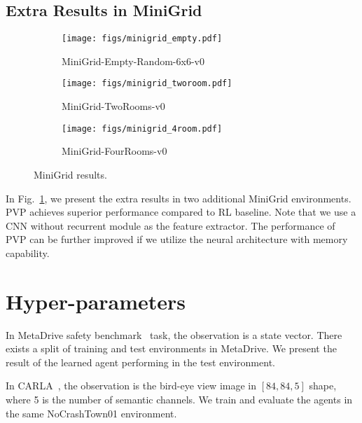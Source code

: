 \subsection{Extra Results in MiniGrid}
\label{section:appendix-extra-results}

\begin{figure}[H]
\centering
\begin{subfigure}[b]{0.34\linewidth}
         \centering
         \texttt{[image: figs/minigrid\_empty.pdf]}
         \caption{MiniGrid-Empty-Random-6x6-v0}
     \end{subfigure}
\begin{subfigure}[b]{0.32\linewidth}
         \centering
         \texttt{[image: figs/minigrid\_tworoom.pdf]}
         \caption{MiniGrid-TwoRooms-v0
}
\end{subfigure}
\begin{subfigure}[b]{0.32\linewidth}
         \centering
         \texttt{[image: figs/minigrid\_4room.pdf]}
         \caption{MiniGrid-FourRooms-v0
}
\end{subfigure}
\caption{
MiniGrid results.
}
\label{fig:minigrid-extra}
\end{figure}
In Fig.~\ref{fig:minigrid-extra}, we present the extra results in two additional MiniGrid environments. PVP achieves superior performance compared to RL baseline. Note that we use a CNN without recurrent module as the feature extractor. The performance of PVP can be further improved if we utilize the neural architecture with memory capability.




\section{Hyper-parameters}
\label{section:appendix-hyper-parameters}


In MetaDrive safety benchmark~\citep{li2021metadrive} task, the observation is a state vector. There exists a split of training and test environments in MetaDrive. We present the result of the learned agent performing in the test environment. 

In CARLA~\citep{Dosovitskiy17}, the observation is the bird-eye view image in $[84, 84, 5]$ shape, where 5 is the number of semantic channels.
We train and evaluate the agents in the same NoCrashTown01 environment.


